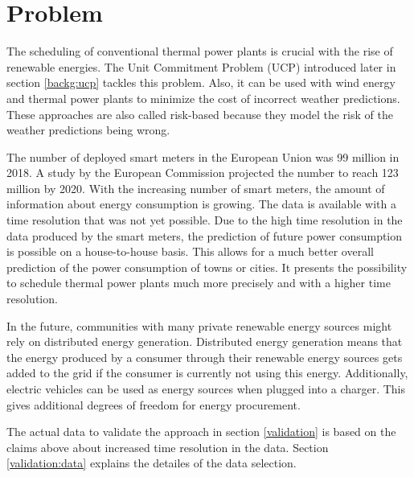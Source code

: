 \section{Problem}

The scheduling of conventional thermal power plants is crucial with the rise of renewable energies.
The Unit Commitment Problem (UCP) introduced later in section \ref{backg:ucp} tackles this problem.
\cite{Banos2011}
Also, it can be used with wind energy and thermal power plants to minimize the cost of incorrect weather predictions.
These approaches are also called risk-based because they model the risk of the weather predictions being wrong.
\cite{Chen2008,Abujarad2017}

The number of deployed smart meters in the European Union was 99 million in 2018.
A study by the European Commission projected the number to reach 123 million by 2020.
\cite{Vlachogiannis2019}
With the increasing number of smart meters, the amount of information about energy consumption is growing.
The data is available with a time resolution that was not yet possible.
Due to the high time resolution in the data produced by the smart meters,
the prediction of future power consumption is possible on a house-to-house basis.
This allows for a much better overall prediction of the power consumption of towns or cities.
\cite{Aiello2016, Basu2013}
It presents the possibility to schedule thermal power plants much more precisely
and with a higher time resolution.

In the future, communities with many private renewable energy sources might rely on distributed energy generation.
Distributed energy generation means that the energy produced by a consumer through their renewable energy sources gets added to the grid if the consumer is currently not using this energy.
Additionally, electric vehicles can be used as energy sources when plugged into a charger.
This gives additional degrees of freedom for energy procurement.
\cite{Aiello2016, Zhang2016}

The actual data to validate the approach in section \ref{validation} is based on the claims above about increased time resolution in the data.
Section \ref{validation:data} explains the detailes of the data selection.
